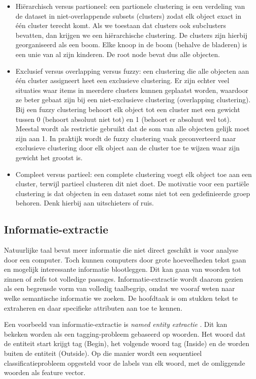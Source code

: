 \begin{itemize}
\item Hi\"erarchisch versus partioneel: een partionele clustering is een verdeling van de dataset in niet-overlappende subsets (clusters) zodat elk object exact in \'e\'en cluster terecht komt. Als we toestaan dat clusters ook subclusters bevatten, dan krijgen we een hi\"erarchische clustering. De clusters zijn hierbij georganiseerd als een boom. Elke knoop in de boom (behalve de bladeren) is een unie van al zijn kinderen. De root node bevat dus alle objecten. 
\item Exclusief versus overlapping versus fuzzy: een clustering die alle objecten aan \'e\'en cluster assigneert heet een exclusieve clustering. Er zijn echter veel situaties waar items in meerdere clusters kunnen geplaatst worden, waardoor ze beter gebaat zijn bij een niet-exclusieve clustering (overlapping clustering). Bij een fuzzy clustering behoort elk object tot een cluster met een gewicht tussen 0 (behoort absoluut niet tot) en 1 (behoort er absoluut wel tot). Meestal wordt als restrictie gebruikt dat de som van alle objecten gelijk moet zijn aan 1. In praktijk wordt de fuzzy clustering vaak geconverteerd naar exclusieve clustering door elk object aan de cluster toe te wijzen waar zijn gewicht het grootst is.
\item Compleet versus partieel: een complete clustering voegt elk object toe aan een cluster, terwijl partieel clusteren dit niet doet. De motivatie voor een parti\"ele clustering is dat objecten in een dataset soms niet tot een gedefinieerde groep behoren. Denk hierbij aan uitschieters of ruis. 
\end{itemize}

\subsection{Informatie-extractie}\label{information-extraction}
Natuurlijke taal bevat meer informatie die niet direct geschikt is voor analyse door een computer. Toch kunnen computers door grote hoeveelheden tekst gaan en mogelijk interessante informatie blootleggen. Dit kan gaan van woorden tot zinnen of zelfs tot volledige passages.
Informatie-extractie \cite{Wilks1997} wordt daarom gezien als een begrensde vorm van volledig taalbegrip, omdat we vooraf weten naar welke semantische informatie we zoeken. De hoofdtaak is om stukken tekst te extraheren en daar specifieke attributen aan toe te kennen. 

Een voorbeeld van informatie-extractie is \textit{named entity extractie} \cite{Chinchor1997}. Dit kan bekeken worden als een tagging-probleem gebaseerd op woorden. Het woord dat de entiteit start krijgt tag  (Begin), het volgende woord tag  (Inside) en de worden buiten de entiteit  (Outside). Op die manier wordt een sequentieel classificatieprobleem opgesteld voor de labels van elk woord, met de omliggende woorden als feature vector.

